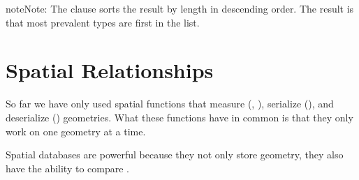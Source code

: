 \documentclass[a4paper,11pt,english]{sphinxmanual}
\begin{document}
\begin{itemize}
\begin{sphinxVerbatim}[commandchars=\\\{\}]
                                         
                                       
                          
                                         
                                       
                                      
      
                                           
                                              
                           
\end{sphinxVerbatim}

\begin{sphinxadmonition}{note}{Note:}
The  clause sorts the result by length in descending order. The result is that most prevalent types are first in the list.
\end{sphinxadmonition}

\end{itemize}


\section{Spatial Relationships}
\label{\detokenize{basic:spatial-relationships}}\label{\detokenize{basic:id9}}
So far we have only used spatial functions that measure (, ), serialize (), and deserialize () geometries. What these functions have in common is that they only work on one geometry at a time.

Spatial databases are powerful because they not only store geometry, they also have the ability to compare .
\end{document}
